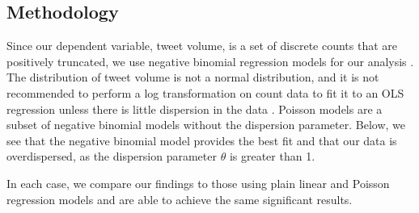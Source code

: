 \subsection{Methodology}

Since our dependent variable, tweet volume, is a set of discrete counts that are positively truncated, we use negative binomial regression models for our analysis \cite{scott1997regression}. The distribution of tweet volume is not a normal distribution, and it is not recommended to perform a log transformation on count data to fit it to an OLS regression unless there is little dispersion in the data \cite{o2010not}. Poisson models are a subset of negative binomial models without the dispersion parameter. Below, we see that the negative binomial model provides the best fit and that our data is overdispersed, as the dispersion parameter $\theta$ is greater than 1.   

In each case, we compare our findings to those using plain linear and Poisson regression models and are able to achieve the same significant results.  

